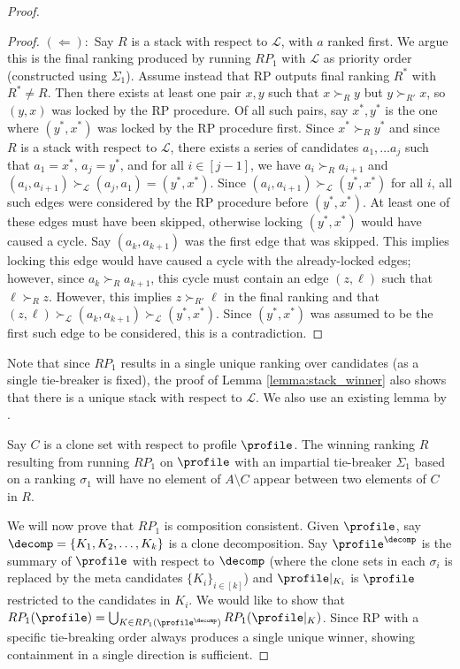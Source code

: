 \begin{proof}
\begin{proof}
    \noindent $(\Leftarrow):$ Say $R$ is a stack with respect to $\mathcal{L}$, with $a$ ranked first. We argue this is the final ranking produced by running $RP_1$ with $\mathcal{L}$ as priority order (constructed using $\Sigma_1$). Assume instead that RP outputs final ranking $R^*$ with $R^* \neq R$. Then there exists at least one pair $x,y$ such that $x\succ_Ry$ but $y\succ_{R'}x$, so $(y,x)$ was locked by the RP procedure. Of all such pairs, say $x^*,y^*$ is the one where $(y^*,x^*)$ was locked by the RP procedure first. Since $x^*\succ_Ry^*$ and since $R$ is a stack with respect to $\mathcal{L}$, there exists a series of candidates $a_1,\ldots a_j$ such that $a_1=x^*$, $a_j=y^*$, and for all $i \in [j-1]$, we have $a_i \succ_R a_{i+1}$ and $(a_i,a_{i+1}) \succ_{\mathcal{L}} (a_j , a_1)=(y^*,x^*)$. Since $(a_i,a_{i+1}) \succ_{\mathcal{L}} (y^*,x^*)$ for all $i$, all such edges were considered by the RP procedure before $(y^*,x^*)$. At least one of these edges must have been skipped, otherwise locking $(y^*,x^*)$ would have caused a cycle. Say $(a_k,a_{k+1})$ was the first edge that was skipped. This implies locking this edge would have caused a cycle with the already-locked edges; however, since $a_k \succ_R a_{k+1}$, this cycle must contain an edge $(z,\ell)$ such that $\ell \succ_R z$. However, this implies $z\succ_{R'} \ell$ in the final ranking and that $(z,\ell) \succ_{\mathcal{L}}(a_k,a_{k+1})\succ_{\mathcal{L}}(y^*,x^*)$. Since $(y^*,x^*)$ was assumed to be the first such edge to be considered, this is a contradiction. 
\end{proof}
Note that since $RP_1$ results in a single unique ranking over candidates (as a single tie-breaker is fixed), the proof of Lemma \ref{lemma:stack_winner} also shows that there is a unique stack with respect to $\mathcal{L}$. We also use an existing lemma by \citet{Zavist89:Complete}.
\begin{lemma}\label{lemma:impartial} Say $C$ is a clone set with respect to profile $\profile$. The winning ranking $R$ resulting from running $RP_1$ on $\profile$ with an impartial tie-breaker $\Sigma_1$ based on a ranking $\sigma_1$ will have no element of $A \setminus C$ appear between two elements of $C$ in $R$. 
\end{lemma}

We will now prove that $RP_1$ is composition consistent.
Given $\profile$, say $\decomp=\{K_1,K_2,\ldots,K_k\}$ is a clone decomposition. Say $\profile^\decomp$ is the summary of $\profile$ with respect to $\decomp$ (where the clone sets in each $\sigma_i$ is replaced by the meta candidates $\{K_i\}_{i \in [k]}$) and $\profile|_{K_i}$ is $\profile$ restricted to the candidates in $K_i$. We would like to show that $RP_1(\profile)= \bigcup_{K \in RP_1(\profile^\decomp)} RP_1(\profile|_K)$. Since RP with a specific tie-breaking order always produces a single unique winner, showing containment in a single direction is sufficient. 


\end{proof}
